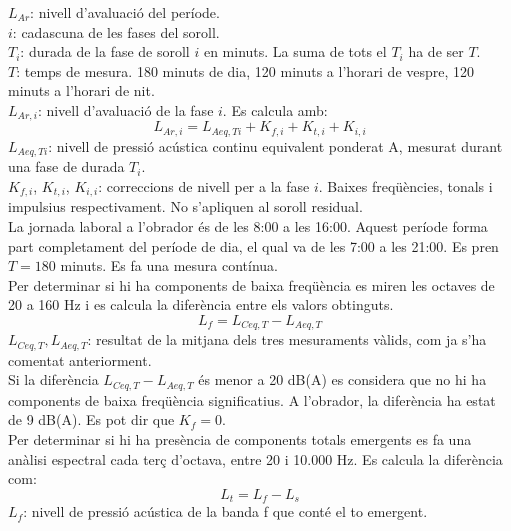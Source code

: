 \noindent $L_{Ar}$: nivell d'avaluació del període.\\
 $i$: cadascuna de les fases del soroll.\\
 $T_{i}$: durada de la fase de soroll $i$ en minuts. La suma de tots el $T_i$ ha de ser $T$.\\
 $T$: temps de mesura. 180 minuts de dia, 120 minuts a l'horari de vespre, 120 minuts a l'horari de nit.\\
 $L_{Ar,i}$: nivell d'avaluació de la fase $i$. Es calcula amb:
\begin{equation}
L_{Ar,i} = L_{Aeq,Ti} + K_{f,i} + K_{t,i} + K_{i,i}
\end{equation}
\noindent $L_{Aeq,Ti}$: nivell de pressió acústica continu equivalent ponderat A, mesurat durant una fase de durada $T_i$.\\
$K_{f,i}$, $K_{t,i}$, $K_{i,i}$: correccions de nivell per a la fase $i$. Baixes freqüències, tonals i impulsius respectivament. No s'apliquen al soroll residual.\\
\newline La jornada laboral a l'obrador és de les 8:00 a les 16:00. Aquest període forma part completament del període de dia, el qual va de les 7:00 a les 21:00. Es pren $T=180$ minuts. Es fa una mesura contínua.\\
%
%
%
%
\newline Per determinar si hi ha components de baixa freqüència es miren les octaves de 20 a 160 Hz i es calcula la diferència entre els valors obtinguts.
\begin{equation}
L_{f} = L_{Ceq,T} - L_{Aeq,T}
\end{equation}
\noindent $L_{Ceq,T}, L_{Aeq,T}$: resultat de la mitjana dels tres mesuraments vàlids, com ja s'ha comentat anteriorment.\\
\newline Si la diferència $L_{Ceq,T} - L_{Aeq,T}$ és menor a 20 dB(A) es considera que no hi ha components de baixa freqüència significatius. A l'obrador, la diferència ha estat de 9 dB(A). Es pot dir que $K_f = 0$.\\
\newline Per determinar si hi ha presència de components totals emergents es fa una anàlisi espectral cada terç d'octava, entre 20 i 10.000 Hz. Es calcula la diferència com:
\begin{equation}
L_t = L_f - L_s
\end{equation}
\noindent $L_f$: nivell de pressió acústica de la banda f que conté el to emergent.\\
